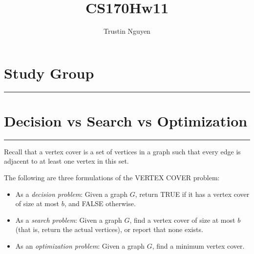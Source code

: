 \documentclass{article}
\title{CS170Hw11}
\author{Trustin Nguyen}
\begin{document}
    \maketitle

\reversemarginpar

\section*{Study Group}
\hrule

\newpage
\section*{Decision vs Search vs Optimization}
\hrule

Recall that a vertex cover is a set of vertices in a graph such that every edge is adjacent to at least one vertex in this set.

The following are three formulations of the VERTEX COVER problem:
    \begin{itemize}
        \item As a \textit{decision problem}: Given a graph $G$, return TRUE if it has a vertex cover of size at most $b$, and FALSE otherwise.

        \item As a \textit{search problem}: Given a graph $G$, find a vertex cover of size at most $b$ (that is, return the actual vertices), or report that none exists.

        \item As an \textit{optimization problem}: Given a graph $G$, find a minimum vertex cover.
    \end{itemize}
\end{document}
